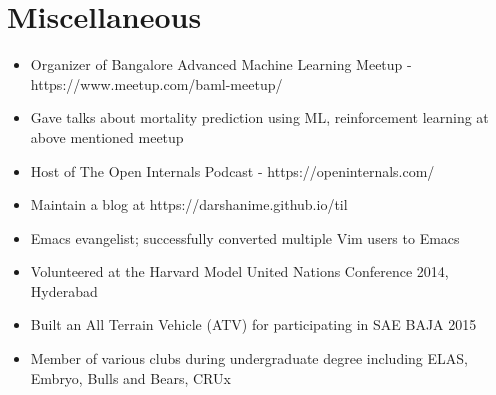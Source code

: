 \documentclass[10pt,letterpaper]{article}
\begin{document}
\section*{Miscellaneous}

\begin{itemize}
    \item Organizer of Bangalore Advanced Machine Learning Meetup - https://www.meetup.com/baml-meetup/
    \item Gave talks about mortality prediction using ML, reinforcement learning at above mentioned meetup
    \item Host of The Open Internals Podcast - https://openinternals.com/
    \item Maintain a blog at https://darshanime.github.io/til
    \item Emacs evangelist; successfully converted multiple Vim users to Emacs 
    \item Volunteered at the Harvard Model United Nations Conference 2014, Hyderabad
    \item Built an All Terrain Vehicle (ATV) for participating in SAE BAJA 2015
    \item Member of various clubs during undergraduate degree including ELAS, Embryo, Bulls and Bears, CRUx
\end{itemize}
\end{document}

